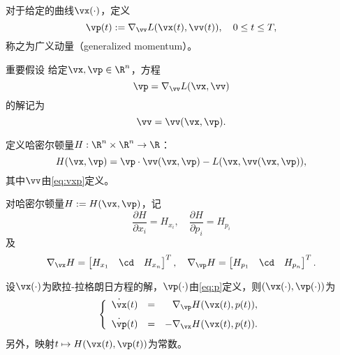 \begin{frame}{\subsecname}
\begin{definition}[广义动量]
对于给定的曲线$\vx(\cdot)$，定义
\begin{equation}\label{eq:p}
    \vp(t) := \nabla_{\vv} L(\vx(t),\vv(t)), \quad 0 \le t \le T,
\end{equation}
称之为广义动量（generalized momentum）。
\end{definition}

\begin{block}{重要假设}
给定$\vx,\vp\in\R^n$，方程
\begin{equation}
\vp = \nabla_{\vv} L(\vx,\vv)
\end{equation}
的解记为
\begin{equation}\label{eq:vxp}
\vv = \vv(\vx,\vp).
\end{equation}
\end{block}

\pause 
\begin{definition}[哈密尔顿量]
定义哈密尔顿量$H:\R^n\times \R^n \to \R$：
\begin{equation}\label{eq:hamilton}
    H(\vx, \vp) = \vp \cdot \vv(\vx, \vp) - L(\vx, \vv(\vx, \vp)),
\end{equation}
其中$\vv$由\eqref{eq:vxp}定义。
\end{definition}
\end{frame}

\begin{frame}{\subsecname}
    对哈密尔顿量$H:=H(\vx,\vp)$，记
    $$
    \frac{\partial H}{\partial x_i} = H_{x_i}, \quad
    \frac{\partial H}{\partial p_i} = H_{p_i}
    $$
    及
    $$
    \nabla_{\vx} H = 
    \begin{bmatrix}
    H_{x_1} & \cd & H_{x_n}
    \end{bmatrix}^T, \quad 
    \nabla_{\vp} H = 
    \begin{bmatrix}
    H_{p_1} & \cd & H_{p_n}
    \end{bmatrix}^T. 
    $$
    \begin{theorem}[哈密尔顿动力系统]
    设$\vx(\cdot)$为欧拉-拉格朗日方程的解，$\vp(\cdot)$由\eqref{eq:p}定义，则$(\vx(\cdot), \vp(\cdot))$为
    \begin{equation}\label{eq:HDS}
        \left\{
        \begin{array}{rcr}
            \dot \vx(t) &=&  \nabla_{\vp} H(\vx(t), p(t)),   \\[.1in]
            \dot \vp(t) &=& -\nabla_{\vx} H(\vx(t), p(t)).
        \end{array}
        \right.
    \end{equation}
    另外，映射$t \mapsto H(\vx(t), \vp(t))$为常数。
    \end{theorem}
\end{frame}

